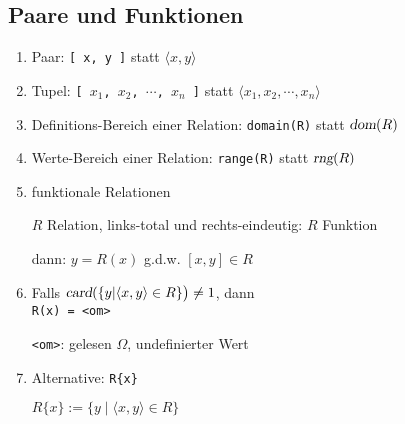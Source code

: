 \documentclass{article}
\def\pair(#1,#2){\langle #1, #2 \rangle}
\begin{document}
\subsection{Paare und Funktionen}
\begin{enumerate}
\item Paar: \quad \texttt{[ x, y ]} \quad statt \quad $\langle x, y \rangle$ 
\item Tupel: \quad \texttt{[ $x_1$, $x_2$, $\cdots$, $x_n$ ]} \quad statt \quad $\langle x_1, x_2, \cdots, x_n \rangle$ 
\item Definitions-Bereich einer Relation: \quad \texttt{domain(R)} \quad statt \quad $\textsl{dom}(R)$
\item Werte-Bereich einer Relation: \quad \texttt{range(R)} \quad statt \quad $\textsl{rng}(R)$
\item funktionale Relationen

      $R$ Relation, links-total und rechts-eindeutig: $R$ Funktion 

      dann: \quad $y = R(x)$ \quad g.d.w. \quad $[x,y] \in R$
\item Falls $\textsl{card}(\{ y | \pair(x,y) \in R \}\bigr) \not= 1$, dann 
      \\[0.1cm]
      \hspace*{1.3cm} \texttt{R(x) = <om>}

      \texttt{<om>}: gelesen $\Omega$, undefinierter Wert
\item Alternative: \texttt{R\{x\}}

      $R\{x\} := \{ y \mid \pair(x,y) \in R \}$
\end{enumerate}
\end{document}

